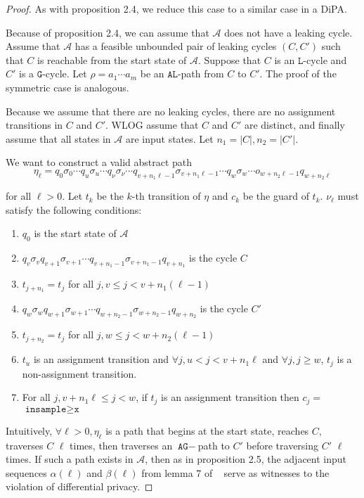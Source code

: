 \documentclass[12pt]{article}
\newcommand{\gguard}{\texttt{insample}\geq \texttt{x}}
\theoremstyle{definition}
\begin{document}
\begin{proof}
	As with proposition 2.4, we reduce this case to a similar case in a DiPA.\@

	Because of proposition 2.4, we can assume that $\mathcal{A}$ does not have a leaking cycle. Assume that $\mathcal{A}$ has a feasible unbounded pair of leaking cycles $(C, C')$ such that $C$ is reachable from the start state of $\mathcal{A}$. Suppose that $C$ is an $\texttt{L}$-cycle and $C'$ is a $\texttt{G}$-cycle. Let $\rho = a_1\cdots a_m$ be an $\texttt{AL}$-path from $C$ to $C'$. The proof of the symmetric case is analogous.

	Because we assume that there are no leaking cycles, there are no assignment transitions in $C$ and $C'$. WLOG assume that $C$ and $C'$ are distinct, and finally assume that all states in $\mathcal{A}$ are input states. Let $n_1 = |C|, n_2 = |C'|$. 

	We want to construct a valid abstract path \[
		\eta_\ell = q_0\sigma_0\cdots q_u\sigma_u\cdots q_\nu\sigma_\nu\cdots q_{v+n_1\ell-1}\sigma_{v+n_1\ell-1}\cdots q_w\sigma_w\cdots o_{w+n_2\ell-1}q_{w+n_2\ell}	
	\]

	for all $\ell > 0$. Let $t_k$ be the $k$-th transition of $\eta$ and $c_k$ be the guard of $t_k$. $\nu_\ell$ must satisfy the following conditions:
	\begin{enumerate}
		\item $q_0$ is the start state of $\mathcal{A}$
		\item $q_v\sigma_v q_{v+1}\sigma_{v+1}\cdots q_{v+n_1-1}\sigma_{v+n_1-1}q_{v+n_1}$ is the cycle $C$
		\item $t_{j+n_1} = t_j$ for all $j, v\leq j < v+n_1(\ell-1)$
		\item $q_w\sigma_w q_{w+1}\sigma_{w+1}\cdots q_{w+n_2-1}\sigma_{w+n_2-1}q_{w+n_2}$ is the cycle $C'$
		\item $t_{j+n_2} = t_j$ for all $j, w\leq j < w+n_2(\ell-1)$
		\item $t_u$ is an assignment transition and $\forall j, u<j < v+n_1\ell$ and $\forall j,j\geq w$, $t_j$ is a non-assignment transition.
		\item For all $j, v+n_1\ell\leq j <w$, if $t_j$ is an assignment transition then $c_j =$\\$\gguard$ 
	\end{enumerate}

	Intuitively, $\forall\ell>0,\eta_\ell$ is a path that begins at the start state, reaches $C$, traverses $C$ $\ell$ times, then traverses an $\texttt{AG}-$path to $C'$ before traversing $C'$ $\ell$ times. If such a path exists in $\mathcal{A}$, then as in proposition 2.5, the adjacent input sequences $\alpha(\ell)$ and $\beta(\ell)$ from lemma 7 of ~\cite{chadhaLinearTimeDecidability2021} serve as witnesses to the violation of differential privacy.



\end{proof}
\end{document}

